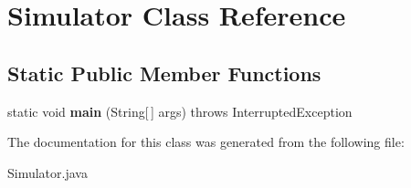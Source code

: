 \hypertarget{class_simulator}{}\section{Simulator Class Reference}
\label{class_simulator}
\subsection*{Static Public Member Functions}
\begin{DoxyCompactItemize}
\item 
\hypertarget{class_simulator_adbf6cf4f887eeff984a12e3c62456ff6}{}static void {\bfseries main} (String\mbox{[}$\,$\mbox{]} args)  throws Interrupted\+Exception\label{class_simulator_adbf6cf4f887eeff984a12e3c62456ff6}

\end{DoxyCompactItemize}


The documentation for this class was generated from the following file\+:\begin{DoxyCompactItemize}
\item 
Simulator.\+java\end{DoxyCompactItemize}
